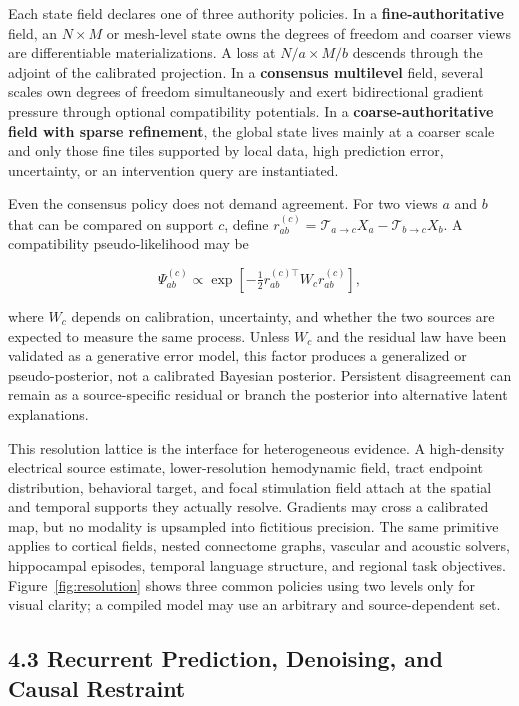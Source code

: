 Each state field declares one of three authority policies. In a
\textbf{fine-authoritative} field, an \(N\times M\) or mesh-level state owns
the degrees of freedom and coarser views are differentiable materializations.
A loss at \(N/a\times M/b\) descends through the adjoint of the calibrated
projection. In a \textbf{consensus multilevel} field, several scales own
degrees of freedom simultaneously and exert bidirectional gradient pressure
through optional compatibility potentials. In a \textbf{coarse-authoritative
field with sparse refinement}, the global state lives mainly at a coarser
scale and only those fine tiles supported by local data, high prediction
error, uncertainty, or an intervention query are instantiated.

Even the consensus policy does not demand agreement. For two views \(a\) and
\(b\) that can be compared on support \(c\), define
\(r_{ab}^{(c)}=\mathcal T_{a\rightarrow c}X_a-
\mathcal T_{b\rightarrow c}X_b\). A compatibility pseudo-likelihood may be

\[
\Psi_{ab}^{(c)}\propto
\exp\!\left[-\tfrac12
r_{ab}^{(c)\top}W_c r_{ab}^{(c)}\right],
\]

where \(W_c\) depends on calibration, uncertainty, and whether the two sources
are expected to measure the same process. Unless \(W_c\) and the residual law
have been validated as a generative error model, this factor produces a
generalized or pseudo-posterior, not a calibrated Bayesian posterior.
Persistent disagreement can remain as a source-specific residual or branch
the posterior into alternative latent explanations.

This resolution lattice is the interface for heterogeneous evidence. A
high-density electrical source estimate, lower-resolution hemodynamic field,
tract endpoint distribution, behavioral target, and focal stimulation field
attach at the spatial and temporal supports they actually resolve. Gradients
may cross a calibrated map, but no modality is upsampled into fictitious
precision. The same primitive applies to cortical fields, nested connectome
graphs, vascular and acoustic solvers, hippocampal episodes, temporal language
structure, and regional task objectives. Figure~\ref{fig:resolution} shows
three common policies using two levels only for visual clarity; a compiled
model may use an arbitrary and source-dependent set.

\ResolutionFigure

\subsection{4.3 Recurrent Prediction, Denoising, and Causal Restraint}

